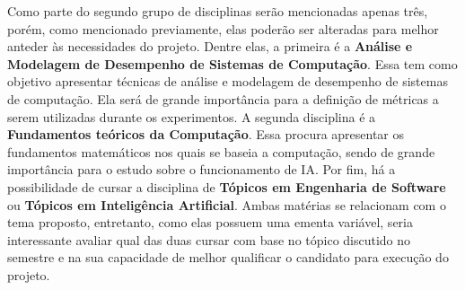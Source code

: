 Como parte do segundo grupo de disciplinas serão mencionadas apenas três, porém, como mencionado previamente, elas poderão ser alteradas para melhor anteder às necessidades do projeto. Dentre elas, a primeira é a \textbf{Análise e Modelagem de Desempenho de Sistemas de Computação}. Essa tem como objetivo apresentar técnicas de análise e modelagem de desempenho de sistemas de computação. Ela será de grande importância para a definição de métricas a serem utilizadas durante os experimentos. A segunda disciplina é a \textbf{Fundamentos teóricos da Computação}. Essa procura apresentar os fundamentos matemáticos nos quais se baseia a computação, sendo de grande importância para o estudo sobre o funcionamento de IA. Por fim, há a possibilidade de cursar a disciplina de \textbf{Tópicos em Engenharia de Software} ou \textbf{Tópicos em Inteligência Artificial}. Ambas matérias se relacionam com o tema proposto, entretanto, como elas possuem uma ementa variável, seria interessante avaliar qual das duas cursar com base no tópico discutido no semestre e na sua capacidade de melhor qualificar o candidato para execução do projeto.
